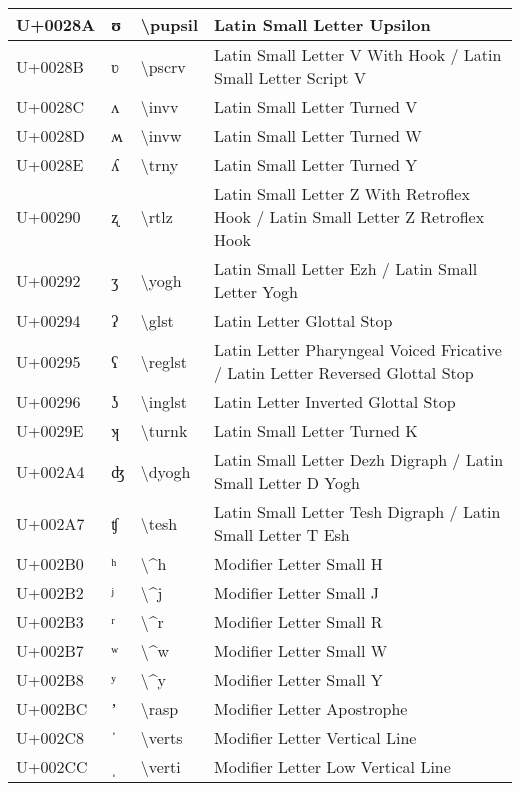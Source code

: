 \begin{table}[h]
\begin{tabulary}{\linewidth}{|L|L|L|L|}
\hline
U+0028A & ʊ & {\textbackslash}pupsil & Latin Small Letter Upsilon \\
\hline
U+0028B & ʋ & {\textbackslash}pscrv & Latin Small Letter V With Hook / Latin Small Letter Script V \\
\hline
U+0028C & ʌ & {\textbackslash}invv & Latin Small Letter Turned V \\
\hline
U+0028D & ʍ & {\textbackslash}invw & Latin Small Letter Turned W \\
\hline
U+0028E & ʎ & {\textbackslash}trny & Latin Small Letter Turned Y \\
\hline
U+00290 & ʐ & {\textbackslash}rtlz & Latin Small Letter Z With Retroflex Hook / Latin Small Letter Z Retroflex Hook \\
\hline
U+00292 & ʒ & {\textbackslash}yogh & Latin Small Letter Ezh / Latin Small Letter Yogh \\
\hline
U+00294 & ʔ & {\textbackslash}glst & Latin Letter Glottal Stop \\
\hline
U+00295 & ʕ & {\textbackslash}reglst & Latin Letter Pharyngeal Voiced Fricative / Latin Letter Reversed Glottal Stop \\
\hline
U+00296 & ʖ & {\textbackslash}inglst & Latin Letter Inverted Glottal Stop \\
\hline
U+0029E & ʞ & {\textbackslash}turnk & Latin Small Letter Turned K \\
\hline
U+002A4 & ʤ & {\textbackslash}dyogh & Latin Small Letter Dezh Digraph / Latin Small Letter D Yogh \\
\hline
U+002A7 & ʧ & {\textbackslash}tesh & Latin Small Letter Tesh Digraph / Latin Small Letter T Esh \\
\hline
U+002B0 & ʰ & {\textbackslash}{\textasciicircum}h & Modifier Letter Small H \\
\hline
U+002B2 & ʲ & {\textbackslash}{\textasciicircum}j & Modifier Letter Small J \\
\hline
U+002B3 & ʳ & {\textbackslash}{\textasciicircum}r & Modifier Letter Small R \\
\hline
U+002B7 & ʷ & {\textbackslash}{\textasciicircum}w & Modifier Letter Small W \\
\hline
U+002B8 & ʸ & {\textbackslash}{\textasciicircum}y & Modifier Letter Small Y \\
\hline
U+002BC & ʼ & {\textbackslash}rasp & Modifier Letter Apostrophe \\
\hline
U+002C8 & ˈ & {\textbackslash}verts & Modifier Letter Vertical Line \\
\hline
U+002CC & ˌ & {\textbackslash}verti & Modifier Letter Low Vertical Line \\

\end{tabulary}
\end{table}
